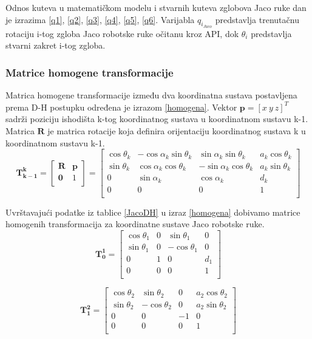 \documentclass[times, utf8, diplomski, numeric]{fer}
\begin{document}
Odnos kuteva u matematičkom modelu i stvarnih kuteva zglobova Jaco ruke dan je izrazima \ref{q1}, \ref{q2}, \ref{q3}, \ref{q4}, \ref{q5}, \ref{q6}.
Varijabla $q_{i_{Jaco}}$ predstavlja trenutačnu rotaciju i-tog zgloba Jaco robotske ruke očitanu kroz API, dok $\theta_i$ predstavlja stvarni zakret i-tog zgloba.

\subsubsection{Matrice homogene transformacije}
Matrica homogene transformacije između dva koordinatna sustava postavljena prema D-H postupku određena je izrazom \ref{homogena}.
Vektor $\mathbf{p} = [x\ y\ z]^T$ sadrži poziciju ishodišta k-tog koordinatnog sustava u koordinatnom sustavu k-1.
Matrica $\mathbf{R}$ je matrica rotacije koja definira orijentaciju koordinatnog sustava k u koordinatnom sustavu k-1.
\begin{equation}
\mathbf{T_{k-1}^k} =
\begin{bmatrix} 
\mathbf{R} & \mathbf{p}\\ 
\mathbf{0} & 1\\
\end{bmatrix}
=
\begin{bmatrix} 
\cos\theta_{k}& -\cos\alpha_{k}\sin\theta_{k} & \sin\alpha_{k}\sin\theta_{k} & a_k\cos\theta_{k}\\ 
\sin\theta_{k}& \cos\alpha_{k}\cos\theta_{k} & -\sin\alpha_{k}\cos\theta_{k} & a_k\sin\theta_{k}\\
0 & \sin\alpha_{k} & \cos\alpha_{k} & d_{k}\\
0 & 0 & 0 & 1\\
\end{bmatrix}
\label{homogena}
\end{equation}

Uvrštavajući podatke iz tablice \ref{JacoDH} u izraz \ref{homogena} dobivamo matrice homogenih transformacija za koordinatne sustave Jaco robotske ruke.
\begin{equation}
\mathbf{T_0^1} =\begin{bmatrix} \cos\theta_{1}& 0 & \sin\theta_{1} & 0\\ 
\sin\theta_{1}& 0 & -\cos\theta_{1} & 0\\
0 & 1 & 0 & d_{1}\\
0 & 0 & 0 & 1\\
\end{bmatrix}
\end{equation}

\begin{equation}
\mathbf{T_1^2} =\begin{bmatrix} \cos\theta_{2}& \sin\theta_{2} & 0 & a_{2}\cos\theta_{2}\\ 
\sin\theta_{2}& -\cos\theta_{2} & 0 & a_{2}\sin\theta_{2}\\ 
0 & 0 & -1 & 0\\
0 & 0 & 0 & 1\\
\end{bmatrix}
\end{equation}
\end{document}
